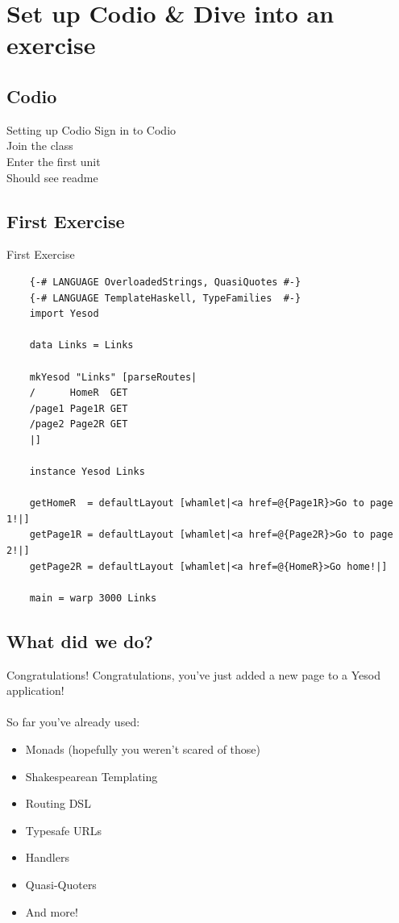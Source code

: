 \documentclass[pdf]{beamer}
\begin{document}
\section{Set up Codio \& Dive into an exercise}

\subsection{Codio}
\begin{frame}{Setting up Codio}
  Sign in to Codio \\

  Join the class \\

  Enter the first unit \\

  Should see readme \\
\end{frame}

\subsection{First Exercise}
\begin{frame}[fragile]{First Exercise}
  \begin{verbatim}
    {-# LANGUAGE OverloadedStrings, QuasiQuotes #-}
    {-# LANGUAGE TemplateHaskell, TypeFamilies  #-}
    import Yesod

    data Links = Links

    mkYesod "Links" [parseRoutes|
    /      HomeR  GET
    /page1 Page1R GET
    /page2 Page2R GET
    |]

    instance Yesod Links

    getHomeR  = defaultLayout [whamlet|<a href=@{Page1R}>Go to page 1!|]
    getPage1R = defaultLayout [whamlet|<a href=@{Page2R}>Go to page 2!|]
    getPage2R = defaultLayout [whamlet|<a href=@{HomeR}>Go home!|]

    main = warp 3000 Links
  \end{verbatim}
\end{frame}

\subsection{What did we do?}

\begin{frame}{Congratulations!}
  Congratulations, you've just added a new page to a Yesod application!\\
  \\
  So far you've already used:\\
  \begin{itemize}
  \item Monads (hopefully you weren't scared of those)
  \item Shakespearean Templating
  \item Routing DSL
  \item Typesafe URLs
  \item Handlers
  \item Quasi-Quoters
  \item And more!
  \end{itemize}
\end{frame}
\end{document}
